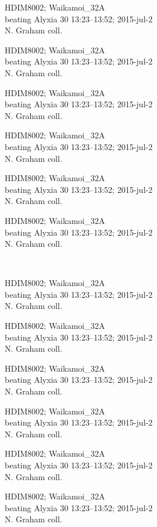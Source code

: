 \documentclass[2pt]{extarticle}
\begin{document}
\noindent
\parbox{0.16\textwidth}{\tiny \raggedright \rule[-0.3\baselineskip]{0pt}{10pt}HDIM8002; Waikamoi\_32A\\ beating Alyxia 30 13:23--13:52; 2015-jul-2\\ N. Graham coll.}
\parbox{0.16\textwidth}{\tiny \raggedright \rule[-0.3\baselineskip]{0pt}{10pt}HDIM8002; Waikamoi\_32A\\ beating Alyxia 30 13:23--13:52; 2015-jul-2\\ N. Graham coll.}
\parbox{0.16\textwidth}{\tiny \raggedright \rule[-0.3\baselineskip]{0pt}{10pt}HDIM8002; Waikamoi\_32A\\ beating Alyxia 30 13:23--13:52; 2015-jul-2\\ N. Graham coll.}
\parbox{0.16\textwidth}{\tiny \raggedright \rule[-0.3\baselineskip]{0pt}{10pt}HDIM8002; Waikamoi\_32A\\ beating Alyxia 30 13:23--13:52; 2015-jul-2\\ N. Graham coll.}
\parbox{0.16\textwidth}{\tiny \raggedright \rule[-0.3\baselineskip]{0pt}{10pt}HDIM8002; Waikamoi\_32A\\ beating Alyxia 30 13:23--13:52; 2015-jul-2\\ N. Graham coll.}
\parbox{0.16\textwidth}{\tiny \raggedright \rule[-0.3\baselineskip]{0pt}{10pt}HDIM8002; Waikamoi\_32A\\ beating Alyxia 30 13:23--13:52; 2015-jul-2\\ N. Graham coll.} \\ 
\vspace{0.001in} 

\noindent
\parbox{0.16\textwidth}{\tiny \raggedright \rule[-0.3\baselineskip]{0pt}{10pt}HDIM8002; Waikamoi\_32A\\ beating Alyxia 30 13:23--13:52; 2015-jul-2\\ N. Graham coll.}
\parbox{0.16\textwidth}{\tiny \raggedright \rule[-0.3\baselineskip]{0pt}{10pt}HDIM8002; Waikamoi\_32A\\ beating Alyxia 30 13:23--13:52; 2015-jul-2\\ N. Graham coll.}
\parbox{0.16\textwidth}{\tiny \raggedright \rule[-0.3\baselineskip]{0pt}{10pt}HDIM8002; Waikamoi\_32A\\ beating Alyxia 30 13:23--13:52; 2015-jul-2\\ N. Graham coll.}
\parbox{0.16\textwidth}{\tiny \raggedright \rule[-0.3\baselineskip]{0pt}{10pt}HDIM8002; Waikamoi\_32A\\ beating Alyxia 30 13:23--13:52; 2015-jul-2\\ N. Graham coll.}
\parbox{0.16\textwidth}{\tiny \raggedright \rule[-0.3\baselineskip]{0pt}{10pt}HDIM8002; Waikamoi\_32A\\ beating Alyxia 30 13:23--13:52; 2015-jul-2\\ N. Graham coll.}
\parbox{0.16\textwidth}{\tiny \raggedright \rule[-0.3\baselineskip]{0pt}{10pt}HDIM8002; Waikamoi\_32A\\ beating Alyxia 30 13:23--13:52; 2015-jul-2\\ N. Graham coll.} \\ 
\vspace{0.001in} 
\end{document}
